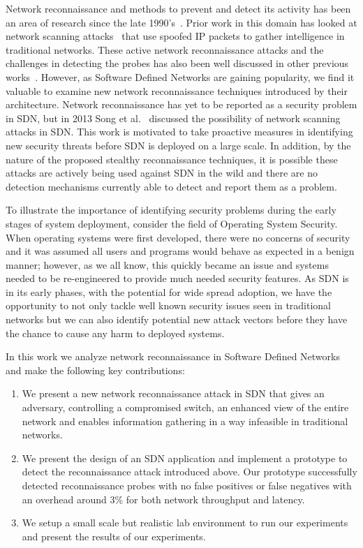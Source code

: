 Network reconnaissance and methods to prevent and detect its activity 
has been an area of research since the late 1990's~\cite{phrack, 
de1999review}. Prior work in this domain has looked at 
network scanning attacks~\cite{de1999review, allman2007brief, 
xiaobing2001detection, barnett2008towards} that use spoofed IP packets
to gather intelligence in traditional networks. These active network 
reconnaissance attacks and the challenges in detecting the probes has 
also been well discussed in other previous 
works~\cite{shaikh2008network}. However, as Software Defined Networks 
are gaining popularity, we find it valuable to examine new network 
reconnaissance techniques introduced by their architecture. Network 
reconnaissance has yet to be reported as a security problem in SDN, but
in 2013 Song et al.~\cite{song2013network} discussed the possibility of 
network scanning attacks in SDN. This work is motivated to take 
proactive measures in identifying new security threats before SDN is 
deployed on a large scale. In addition, by the nature of the proposed 
stealthy reconnaissance techniques, it is possible these attacks are 
actively being used against SDN in the wild and there are no detection
mechanisms currently able to detect and report them as a problem. 

To illustrate the importance of identifying security problems during the
early stages of system deployment, consider the field of Operating System
Security. When operating systems were first developed, there were no 
concerns of security and it was assumed all users and programs would behave
as expected in a benign manner; however, as we all know, this quickly 
became an issue and systems needed to be re-engineered to provide much 
needed security features. As SDN is in its early phases, with the
potential for wide spread adoption, we have the opportunity to not only
tackle well known security issues seen in traditional networks but we
can also identify potential new attack vectors before they have the chance 
to cause any harm to deployed systems.

In this work we analyze network reconnaissance in Software Defined
Networks and make the following key contributions:
\begin{enumerate}
  \item We present a new network reconnaissance attack in SDN that 
  gives an adversary, controlling a compromised switch, an enhanced view 
  of the entire network and enables information gathering in a way 
  infeasible in traditional networks.
  \item We present the design of an SDN application and implement a 
  prototype to detect the reconnaissance attack introduced above. Our
  prototype successfully detected reconnaissance probes with no false 
  positives or false negatives with an overhead around 3\% for both
  network throughput and latency.
  \item We setup a small scale but realistic lab environment to run 
  our experiments and present the results of our experiments.
\end{enumerate}
